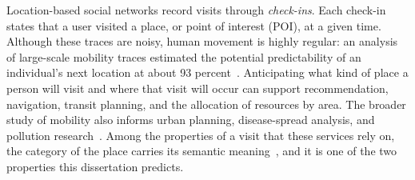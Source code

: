 Location-based social networks record visits through \emph{check-ins}. Each check-in
states that a user visited a place, or point of interest (POI), at a given time.
Although these traces are noisy, human movement is highly regular: an analysis of
large-scale mobility traces estimated the potential predictability of an individual's
next location at about 93 percent~\cite{song2010limits}. Anticipating what kind of
place a person will visit and where that visit will occur can support recommendation,
navigation, transit planning, and the allocation of resources by area. The broader
study of mobility also informs urban planning, disease-spread analysis, and pollution
research~\cite{luca2021mobilitysurvey}. Among the properties of a visit that these
services rely on, the category of the place carries its semantic
meaning~\cite{Xu2023}, and it is one of the two properties this dissertation predicts.
%
